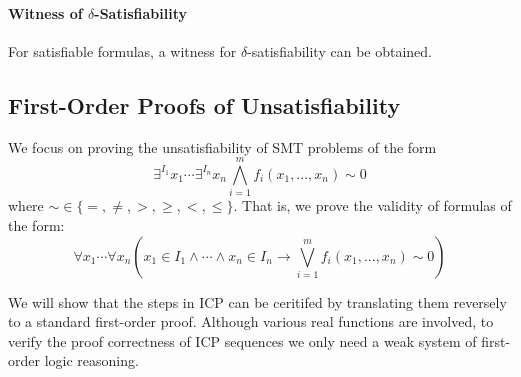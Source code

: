 \documentclass[envcountsect]{llncs}
\begin{document}
\paragraph{Witness of $\delta$-Satisfiability}
For satisfiable formulas, a witness for $\delta$-satisfiability can be obtained. 


\subsection{First-Order Proofs of Unsatisfiability}

We focus on proving the unsatisfiability of SMT problems of the form
$$\exists^{I_1} x_1\cdots \exists^{I_n} x_n \bigwedge_{i=1}^m
f_i(x_1,...,x_n)\sim 0$$
where $\sim \in \{=,\neq, >, \geq, <, \leq\}$. That is, we prove the validity
of formulas of the form:
$$\forall x_1 \cdots \forall x_n (x_1\in I_1\wedge \cdots \wedge x_n\in I_n
\rightarrow \bigvee_{i=1}^m f_i(x_1,...,x_n)\sim 0)$$

We will show that the steps in ICP can be ceritifed by translating them
reversely to a standard first-order proof. Although various real functions are
involved, to verify the proof correctness of ICP sequences we only need a weak
system of first-order logic reasoning.  
\begin{definition}[Language]

\end{definition}
\end{document}
